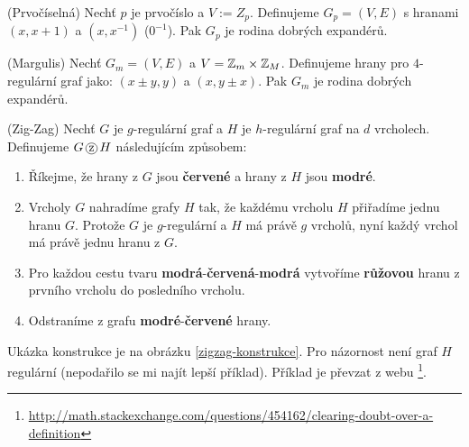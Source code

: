 \vt (Prvočíselná) Nechť $p$ je prvočíslo a $V:=Z_p$. Definujeme $G_p=(V,E)$ s 
hranami $(x, x+1)$ a $(x,x^{-1})$ ($0^{-1}$). Pak $G_p$ je rodina dobrých 
expandérů.

\vt (Margulis) Nechť $G_m=(V,E)$ a $V=\mathbb{Z}_m \times \mathbb{Z}_M$. Definujeme hrany pro 
$4$-regulární graf jako: $(x\pm y, y)$ a $(x,y\pm x)$. Pak $G_m$ je rodina 
dobrých expandérů.

\df (Zig-Zag) Nechť $G$ je $g$-regulární graf a $H$ je $h$-regulární graf na $d$ 
vrcholech. Definujeme $G \zz H$ následujícím způsobem:
\begin{enumerate}
	\item Říkejme, že hrany z $G$ jsou {\bf\color{red}červené} a hrany z $H$ 
		jsou {\bf\color{blue}modré}.
	\item Vrcholy $G$ nahradíme grafy $H$ tak, že každému vrcholu $H$ přiřadíme 
	jednu hranu $G$. Protože $G$ je $g$-regulární a $H$ má právě $g$ vrcholů, 
	nyní každý vrchol má právě jednu hranu z $G$.
	\item Pro každou cestu tvaru 
		{\bf\color{blue}modrá}-{\bf\color{red}červená}-{\bf\color{blue}modrá} 
		vytvoříme {\bf\color{magenta}růžovou} hranu z prvního vrcholu do 
		posledního vrcholu.
	\item Odstraníme z grafu {\bf\color{blue}modré}-{\bf\color{red}červené} 
		hrany.
\end{enumerate}
Ukázka konstrukce je na obrázku \ref{zigzag-konstrukce}. Pro názornost není graf
$H$ regulární (nepodařilo se mi najít lepší příklad). Příklad je převzat z webu
\footnote{
\url{http://math.stackexchange.com/questions/454162/clearing-doubt-over-a-definition}}.

